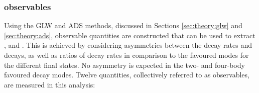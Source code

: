 \subsubsection{\CP observables}
\label{sec:theory:observables}

Using the GLW and ADS methods, discussed in Sections \ref{sec:theory:glw} and \ref{sec:theory:ads}, observable quantities are constructed that can be used to extract \rb, \deltab and \Pgamma. This is achieved by considering asymmetries between the decay rates \Bm and \Bp decays, as well as ratios of decay rates in comparison to the favoured modes for the different \Dz final states. No \CP asymmetry is expected in the two- and four-body favoured \Dz decay modes. Twelve quantities, collectively referred to as \CP observables, are measured in this analysis:

